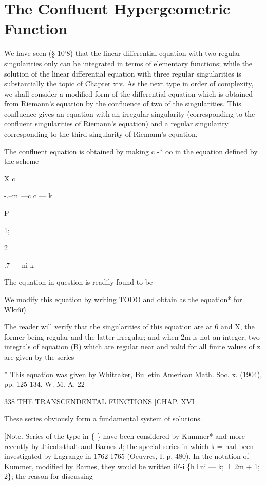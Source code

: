 \chapter{The Confluent Hypergeometric Function}


We have seen (§ 10'8) that the linear differential equation with two
regular singularities only can be integrated in terms of elementary
functions; while the solution of the linear differential equation
with three regular singularities is substantially the topic of Chapter
xiv. As the next type in order of complexity, we shall consider a
modified form of the differential equation which is obtained from
Riemann's equation by the confluence of two of the singularities. This
confluence gives an equation with an irregular singularity
(corresponding to the confluent singularities of Riemann's equation)
and a regular singularity corresponding to the third singularity of
Riemann's equation.

The confluent equation is obtained by making c -* oo in the equation
defined by the scheme

X c

-.--m —c c — k

P

1;

2

.7 — ni k

The equation in question is readily found to be

We modify this equation by writing TODO and obtain as the equation*
for Wk\^mi\^)

The reader will verify that the singularities of this equation are at
6 and X, the former being regular and the latter irregular; and when
2m is not an integer, two integrals of equation (B) which are regular
near and valid for all finite values of z are given by the series

* This equation was given by Whittaker, Bulletin American Math. Soc.
x. (1904), pp. 125-134. W. M. A. 22

338 THE TRANSCENDENTAL FUNCTIONS [CHAP. XVI

These series obviously form a fundamental system of solutions.

[Note. Series of the type in \{ \} have been considered by Kummer* and
more recently by Jticobsthalt and Barnes J; the special series in
which k = had been investigated by Lagrange in 1762-1765 (Oeuvres, I.
p. 480). In the notation of Kummer, modified by Barnes, they would be
written iF-i \{h±ni — k; ± 2m + 1; 2\}; the reason for discussing

